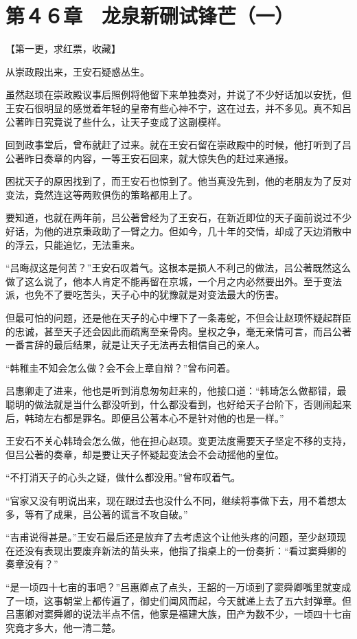 \section{第４６章　龙泉新硎试锋芒（一）}

【第一更，求红票，收藏】

从崇政殿出来，王安石疑惑丛生。

虽然赵顼在崇政殿议事后照例将他留下来单独奏对，并说了不少好话加以安抚，但王安石很明显的感觉着年轻的皇帝有些心神不宁，这在过去，并不多见。真不知吕公著昨日究竟说了些什么，让天子变成了这副模样。

回到政事堂后，曾布就赶了过来。就在王安石留在崇政殿中的时候，他打听到了吕公著昨日奏章的内容，一等王安石回来，就大惊失色的赶过来通报。

困扰天子的原因找到了，而王安石也惊到了。他当真没先到，他的老朋友为了反对变法，竟然连这等两败俱伤的策略都用上了。

要知道，也就在两年前，吕公著曾经为了王安石，在新近即位的天子面前说过不少好话，为他的进京秉政助了一臂之力。但如今，几十年的交情，却成了天边消散中的浮云，只能追忆，无法重来。

“吕晦叔这是何苦？”王安石叹着气。这根本是损人不利己的做法，吕公著既然这么做了这么说了，他本人肯定不能再留在京城，一个月之内必然要出外。至于变法派，也免不了要吃苦头，天子心中的犹豫就是对变法最大的伤害。

但最可怕的问题，还是他在天子的心中埋下了一条毒蛇，不但会让赵顼怀疑起群臣的忠诚，甚至天子还会因此而疏离至亲骨肉。皇权之争，毫无亲情可言，而吕公著一番言辞的最后结果，就是让天子无法再去相信自己的亲人。

“韩稚圭不知会怎么做？会不会上章自辩？”曾布问着。

吕惠卿走了进来，他也是听到消息匆匆赶来的，他接口道：“韩琦怎么做都错，最聪明的做法就是当什么都没听到，什么都没看到，也好给天子台阶下，否则闹起来后，韩琦左右都是罪名。即便吕公著本心不是针对他的也是一样。”

王安石不关心韩琦会怎么做，他在担心赵顼。变更法度需要天子坚定不移的支持，但吕公著的奏章，却是要让天子怀疑起变法会不会动摇他的皇位。

“不打消天子的心头之疑，做什么都没用。”曾布叹着气。

“官家又没有明说出来，现在跟过去也没什么不同，继续将事做下去，用不着想太多，等有了成果，吕公著的谎言不攻自破。”

“吉甫说得甚是。”王安石最后还是放弃了去考虑这个让他头疼的问题，至少赵顼现在还没有表现出要废弃新法的苗头来，他指了指桌上的一份奏折：“看过窦舜卿的奏章没有？”

“是一顷四十七亩的事吧？”吕惠卿点了点头，王韶的一万顷到了窦舜卿嘴里就变成了一顷，这事朝堂上都传遍了，御史们闻风而起，今天就递上去了五六封弹章。但吕惠卿对窦舜卿的说法半点不信，他家是福建大族，田产为数不少，一顷四十七亩究竟才多大，他一清二楚。

